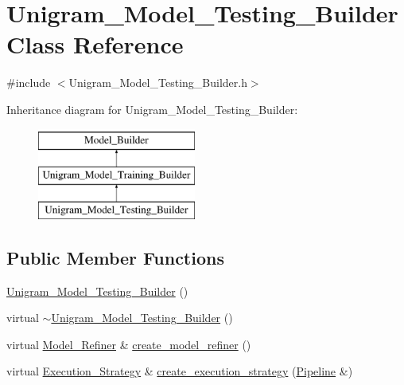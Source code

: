 \hypertarget{class_unigram___model___testing___builder}{
\section{Unigram\_\-Model\_\-Testing\_\-Builder Class Reference}
\label{class_unigram___model___testing___builder}
}


{\ttfamily \#include $<$Unigram\_\-Model\_\-Testing\_\-Builder.h$>$}

Inheritance diagram for Unigram\_\-Model\_\-Testing\_\-Builder:\begin{figure}[H]
\begin{center}
\leavevmode
\includegraphics[height=3cm]{class_unigram___model___testing___builder}
\end{center}
\end{figure}
\subsection*{Public Member Functions}
\begin{DoxyCompactItemize}
\item 
\hyperlink{class_unigram___model___testing___builder_a4af868e1b35b7ebb01ed4dbc59515bd5}{Unigram\_\-Model\_\-Testing\_\-Builder} ()
\item 
virtual \hyperlink{class_unigram___model___testing___builder_a846e6af183b9b5259a4544335c3ad02b}{$\sim$Unigram\_\-Model\_\-Testing\_\-Builder} ()
\item 
virtual \hyperlink{class_model___refiner}{Model\_\-Refiner} \& \hyperlink{class_unigram___model___testing___builder_a694c9cb5f270cad6ff5e9d0b45da9ba6}{create\_\-model\_\-refiner} ()
\item 
virtual \hyperlink{class_execution___strategy}{Execution\_\-Strategy} \& \hyperlink{class_unigram___model___testing___builder_a934d4e14760ff82eeae8165f9c628a95}{create\_\-execution\_\-strategy} (\hyperlink{class_pipeline}{Pipeline} \&)
\end{DoxyCompactItemize}


